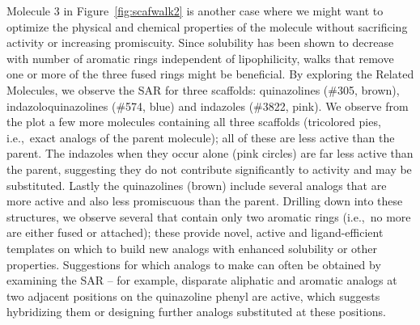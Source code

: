 \documentclass[11pt,letterpaper]{article}
\newcommand*\fref[1]{Figure~\ref{fig:#1}}
\newcommand*\ie{i.e.,~}
\begin{document}
Molecule 3 in \fref{scafwalk2} is another case where we might want to optimize the physical and chemical properties of the molecule without sacrificing activity or increasing promiscuity. Since solubility has been shown to decrease with number of aromatic rings independent of lipophilicity\cite{Hill2010}, walks that remove one or more of the three fused rings might be beneficial. By exploring the Related Molecules, we observe the SAR for three scaffolds: quinazolines (\#305, brown), indazoloquinazolines (\#574, blue) and indazoles (\#3822, pink). We observe from the plot a few more molecules containing all three scaffolds (tricolored pies, \ie exact analogs of the parent molecule); all of these are less active than the parent. The indazoles when they occur alone (pink circles) are far less active than the parent, suggesting they do not contribute significantly to activity and may be substituted. Lastly the quinazolines (brown) include several analogs that are more active and also less promiscuous than the parent. Drilling down into these structures, we observe several that contain only two aromatic rings (\ie no more are either fused or attached); these provide novel, active and ligand-efficient templates on which to build new analogs with enhanced solubility or other properties. Suggestions for which analogs to make can often be obtained by examining the SAR -- for example, disparate aliphatic and aromatic analogs at two adjacent positions on the quinazoline phenyl are active, which suggests hybridizing them or designing further analogs substituted at these positions.
\end{document}
